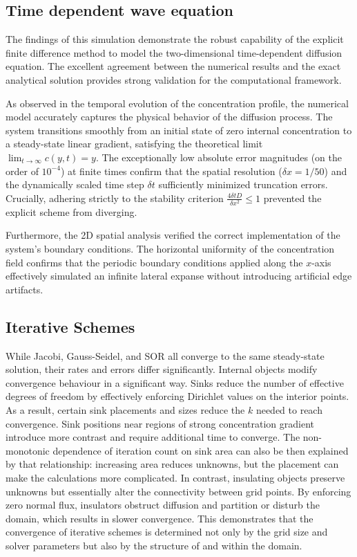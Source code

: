 \documentclass[10pt, journal]{IEEEtran}
\begin{document}
    \subsection{Time dependent wave equation}
        The findings of this simulation demonstrate the robust capability of the explicit finite difference method to model the two-dimensional time-dependent diffusion equation. The excellent agreement between the numerical results and the exact analytical solution provides strong validation for the computational framework.

        As observed in the temporal evolution of the concentration profile, the numerical model accurately captures the physical behavior of the diffusion process. The system transitions smoothly from an initial state of zero internal concentration to a steady-state linear gradient, satisfying the theoretical limit $\lim_{t\rightarrow\infty}c(y,t)=y$. The exceptionally low absolute error magnitudes (on the order of $10^{-4}$) at finite times confirm that the spatial resolution ($\delta x = 1/50$) and the dynamically scaled time step $\delta t$ sufficiently minimized truncation errors. Crucially, adhering strictly to the stability criterion $\frac{4\delta tD}{\delta x^{2}}\le1$ prevented the explicit scheme from diverging.
        
        Furthermore, the 2D spatial analysis verified the correct implementation of the system's boundary conditions. The horizontal uniformity of the concentration field confirms that the periodic boundary conditions applied along the $x$-axis effectively simulated an infinite lateral expanse without introducing artificial edge artifacts. 

        
    \subsection{Iterative Schemes}
        While Jacobi, Gauss-Seidel, and SOR all converge to the same steady-state solution, their rates and errors differ significantly. 
        Internal objects modify convergence behaviour in a significant way. Sinks reduce the number of effective degrees of freedom by effectively enforcing Dirichlet values on the interior points. As a result, certain sink placements and sizes reduce the $k$ needed to reach convergence. Sink positions near regions of strong concentration gradient introduce more contrast and require additional time to converge. The non-monotonic dependence of iteration count on sink area can also be then explained by that relationship: increasing area reduces unknowns, but the placement can make the calculations more complicated.
        In contrast, insulating objects preserve unknowns but essentially alter the connectivity between grid points. By enforcing zero normal flux, insulators obstruct diffusion and partition or disturb the domain, which results in slower convergence.
        This demonstrates that the convergence of iterative schemes is determined not only by the grid size and solver parameters but also by the structure of and within the domain.
        
\end{document}
